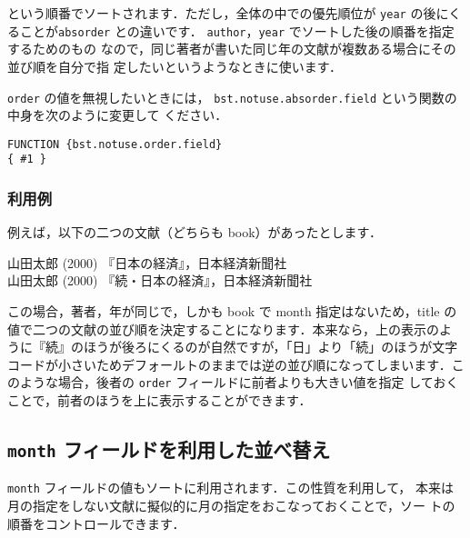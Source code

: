 \documentclass[article]{jlreq}
\begin{document}
\noindent という順番でソートされます．ただし，全体の中での優先順位が 
\texttt{year} の後にくることが\texttt{absorder} との違いです．
\texttt{author}，\texttt{year} でソートした後の順番を指定するためのもの
なので，同じ著者が書いた同じ年の文献が複数ある場合にその並び順を自分で指
定したいというようなときに使います．

\texttt{order} の値を無視したいときには，
\texttt{bst.notuse.absorder.field} という関数の中身を次のように変更して
ください．
\begin{screen}
\begin{verbatim}
FUNCTION {bst.notuse.order.field}
{ #1 }
\end{verbatim}
\end{screen}


\subsubsection{利用例}

例えば，以下の二つの文献（どちらも book）があったとします．
\begin{screen}
\begin{flushleft}
 山田太郎 (2000) 『日本の経済』，日本経済新聞社\\
 山田太郎 (2000) 『続・日本の経済』，日本経済新聞社
\end{flushleft}
\end{screen}

この場合，著者，年が同じで，しかも book で month 指定はないため，title 
の値で二つの文献の並び順を決定することになります．本来なら，上の表示のよ
うに『続』のほうが後ろにくるのが自然ですが，「日」より「続」のほうが文字
コードが小さいためデフォールトのままでは逆の並び順になってしまいます．こ
のような場合，後者の \texttt{order} フィールドに前者よりも大きい値を指定
しておくことで，前者のほうを上に表示することができます．

\subsection{\texttt{month} フィールドを利用した並べ替え}

\texttt{month} フィールドの値もソートに利用されます．この性質を利用して，
本来は月の指定をしない文献に擬似的に月の指定をおこなっておくことで，ソー
トの順番をコントロールできます．
\end{document}
